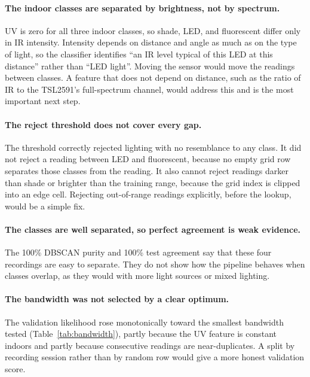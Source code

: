 \documentclass[10pt,a4paper,twocolumn]{article}
\begin{document}
\paragraph{The indoor classes are separated by brightness, not by spectrum.} UV is zero for all three indoor classes, so shade, LED, and fluorescent differ only in IR intensity. Intensity depends on distance and angle as much as on the type of light, so the classifier identifies ``an IR level typical of this LED at this distance'' rather than ``LED light''. Moving the sensor would move the readings between classes. A feature that does not depend on distance, such as the ratio of IR to the TSL2591's full-spectrum channel, would address this and is the most important next step.

\paragraph{The reject threshold does not cover every gap.} The threshold correctly rejected lighting with no resemblance to any class. It did not reject a reading between LED and fluorescent, because no empty grid row separates those classes from the reading. It also cannot reject readings darker than shade or brighter than the training range, because the grid index is clipped into an edge cell. Rejecting out-of-range readings explicitly, before the lookup, would be a simple fix.

\paragraph{The classes are well separated, so perfect agreement is weak evidence.} The 100\% DBSCAN purity and 100\% test agreement say that these four recordings are easy to separate. They do not show how the pipeline behaves when classes overlap, as they would with more light sources or mixed lighting.

\paragraph{The bandwidth was not selected by a clear optimum.} The validation likelihood rose monotonically toward the smallest bandwidth tested (Table~\ref{tab:bandwidth}), partly because the UV feature is constant indoors and partly because consecutive readings are near-duplicates. A split by recording session rather than by random row would give a more honest validation score.
\end{document}
